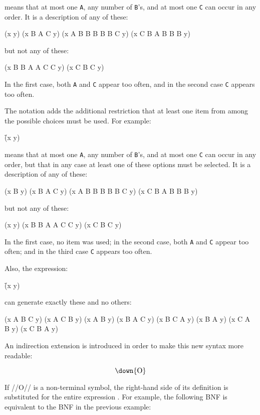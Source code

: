 \noindent means that at most one {\tt A}, any number of {\tt B}'s, and at most one {\tt C} can occur in any order. It is a description of any of these:

\code
 (x y)
 (x B A C y)
 (x A B B B B B C y)
 (x C B A B B B y) \endcode

\noindent but not any of these:

\code
 (x B B A A C C y)
 (x C B C y) \endcode

\noindent In the first case, both {\tt A} and {\tt C} appear too often, and in the second case {\tt C} appears too often.


The notation   adds the additional restriction that at least one item from among the possible choices must be used.  For example:

\f{(x  y)}

\noindent means that at most one {\tt A}, any number of {\tt B}'s, and at most one {\tt C} can occur in any order, but that in any case at least one of these options must be selected. It is a description of any of these:

\code
 (x B y)
 (x B A C y)
 (x A B B B B B C y)
 (x C B A B B B y) \endcode

\noindent but not any of these:

\code
 (x y)
 (x B B A A C C y)
 (x C B C y) \endcode

\noindent In the first case, no item was used; in the second case, both {\tt A} and {\tt C} appear too often; and in the third case {\tt C} appears too often.

Also, the expression:

\f{(x  y)}

\noindent can generate exactly these and no others:

\code
 (x A B C y)
 (x A C B y)
 (x A B y)
 (x B A C y)
 (x B C A y)
 (x B A y)
 (x C A B y)
 (x C B A y) \endcode

\endsubsubsubsection%


An indirection extension is introduced in order to make this new syntax more readable:

$$\hbox{\down{O}}$$

\noindent If //O// is a non-terminal symbol, the right-hand side of its definition is substituted for the entire expression  .  For example, the following BNF is equivalent to the BNF in the previous example:

